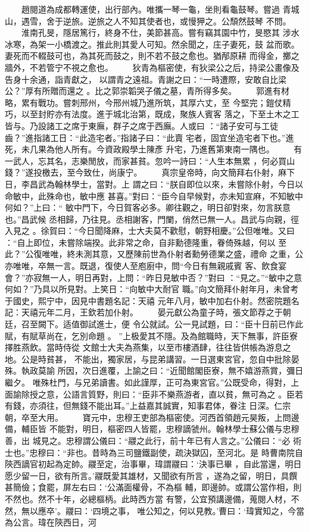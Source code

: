 \documentclass{ctexart}
\begin{document}
　　趙閱道為成都轉運使，出行部內。唯攜一琴一龜，坐則看龜鼓琴。嘗過 青城山，遇雪，舍于逆旅。逆旅之人不知其使者也，或慢狎之。公頹然鼓琴 不問。 　　淮南孔旻，隱居篤行，終身不仕，美節甚高。嘗有竊其園中竹，旻愍其 涉水冰寒，為架一小橋渡之。推此則其愛人可知。然余聞之，庄子妻死，鼓 盆而歌。妻死而不輟鼓可也，為其死而鼓之，則不若不鼓之愈也。猶邴原耕 而得金，擲之牆外，不若管宁不視之愈也。 　　狄青為樞密使，有狄梁公之后，持梁公畫像及告身十余通，詣青獻之， 以謂青之遠祖。青謝之曰：``一時遭際，安敢自比梁公？''厚有所贈而還之 。比之郭崇韜哭子儀之墓，青所得多矣。 　　郭進有材略，累有戰功。嘗刺邢州，今邢州城乃進所筑，其厚六丈，至 今堅完；鎧仗精巧，以至封貯亦有法度。進于城北治第，既成，聚族人賓客 落之，下至土木之工皆与。乃設諸工之席于東廡，群子之席于西廡。人或曰 ：``諸子安可与工徒齒？''進指諸工日：``此造宅者。''指諸子曰：``此賣 宅者，固宜坐造宅者下也。''進死，未几果為他人所有。今資政殿學土陳彥 升宅，乃進舊第東南一隅也。 　　有一武人，忘其名，志樂閒放，而家甚貧。忽吟一詩曰：``人生本無累 ，何必買山錢？''遂投檄去，至今致仕，尚康宁。 　　真宗皇帝時，向文簡拜右仆射，麻下日，李昌武為翰林學士，當對。上 謂之曰：``朕自即位以來，未嘗除仆射，今日以命敏中，此殊命也，敏中應 甚喜。''對曰：``臣今自早候對，亦未知宣麻，不知敏中何如？''上曰：`` 敏中門下，今日賀客必多。卿往觀之，明日卻對來，勿言朕意也。''昌武候 丞相歸，乃往見。丞相謝客，門闌，俏然已無一人。昌武与向親，徑入見之 。徐賀曰：``今日聞降麻，士大夫莫不歡慰，朝野相慶。''公但唯唯。又曰 ：``自上即位，未嘗除端揆。此非常之命，自非勳德隆重，眷倚殊越，何以 至此？''公復唯唯，終未測其意，又歷陳前世為仆射者勳勞德業之盛，禮命 之重，公亦唯唯，卒無一言。既退，復使人至庖廚中，問``今日有無親戚賓 客、飲食宴會？''亦寂無一人，明日再對，上問：``昨日見敏中否？''對曰 ：``見之。''``敏中之意何如？''乃具以所見對。上笑日：``向敏中大耐官 職。''向文簡拜仆射年月，未曾考于國史，熙宁中，因見中書題名記：天禧 元年八月，敏中加右仆射。然密院題名記：天禧元年二月，王欽若加仆射。 　　晏元獻公為童子時，張文節荐之于朝廷，召至闕下。适值御試進士，便 令公就試。公一見試題，曰：``臣十日前已作此賦，有賦草尚在，乞別命題 。 ''上极愛其不隱。及為館職時，天下無事，許臣寮擇胜燕飲。當時侍從 文館士大夫為燕集，以至市樓酒肆，往往皆供帳為游息之地。公是時貧甚， 不能出，獨家居，与昆弟講習。一日選東宮官，忽自中批除晏殊。執政莫諭 所因，次日進覆，上諭之曰：``近聞館閣臣寮，無不嬉游燕賞，彌日繼夕。 唯殊杜門，与兄弟讀書。如此謹厚，正可為東宮官。''公既受命，得對，上 面諭除授之意，公語言質野，則曰：``臣非不樂燕游者，直以貧，無可為之 。臣若有錢，亦須往，但無錢不能出耳。''上益嘉其誠實，知事君体，眷注 日深。仁宗朝，卒至大用。 　　寶元中，忠穆王吏部為樞密使。河西首領趙元昊叛，上問邊備，輔臣皆 不能對，明日，樞密四人皆罷，忠穆謫虢州。翰林學士蘇公儀与忠穆善，出 城見之。忠穆謂公儀曰：``鬷之此行，前十年已有人言之。''公儀曰：``必 術士也。''忠穆曰：``非也。昔時為三司鹽鐵副使，疏決獄囚，至河北。是 時曹南院自陝西謫官初起為定帥。鬷至定，治事畢，瑋謂鬷曰：`決事已畢 ，自此當還，明日愿少留一日，欲有所言。'鬷既愛其雄材，又聞欲有所言 ，遂為之留，明日，具饌甚簡儉；食罷，屏左右曰：`公滿面權骨，不為樞 輔，即邊帥。或謂公當作相，則不然也。然不十年，必總樞柄。此時西方當 有警，公宜預講邊備，蒐閱人材，不然，無以應卒'。鬷曰：`四境之事， 唯公知之，何以見教。'曹曰：`瑋實知之，今當為公言。瑋在陝西日，河 
\end{document}
